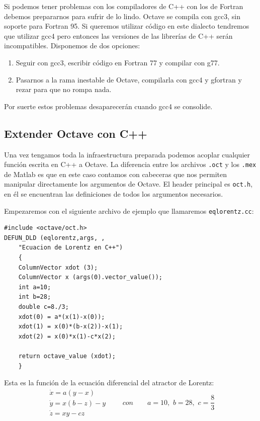 Si podemos tener problemas con los compiladores de C++ con los de
Fortran debemos prepararnos para sufrir de lo lindo. Octave se compila
con gcc3, sin soporte para Fortran 95. Si queremos utilizar código en
este dialecto tendremos que utilizar gcc4 pero entonces las versiones
de las librerías de C++ serán incompatibles. Disponemos de dos
opciones:

\begin{enumerate}
\item Seguir con gcc3, escribir código en Fortran 77 y compilar con
  g77.
\item Pasarnos a la rama inestable de Octave, compilarla con gcc4 y
  gfortran y rezar para que no rompa nada.
\end{enumerate}
Por suerte estos problemas desaparecerán cuando gcc4 se consolide.


\subsection{Extender Octave con C++}

Una vez tengamos toda la infraestructura preparada podemos acoplar
cualquier función escrita en C++ a Octave. La diferencia entre los
archivos \texttt{.oct} y los \texttt{.mex} de Matlab es que en este
caso contamos con cabeceras que nos permiten manipular directamente
los argumentos de Octave. El header principal es \texttt{oct.h}, en él
se encuentran las definiciones de todos los argumentos necesarios.

Empezaremos con el siguiente archivo de ejemplo que llamaremos
\texttt{eqlorentz.cc}:

\begin{verbatim}
#include <octave/oct.h>
DEFUN_DLD (eqlorentz,args, ,
    "Ecuacion de Lorentz en C++")
    {
    ColumnVector xdot (3);
    ColumnVector x (args(0).vector_value());
    int a=10;
    int b=28;
    double c=8./3;
    xdot(0) = a*(x(1)-x(0));
    xdot(1) = x(0)*(b-x(2))-x(1);
    xdot(2) = x(0)*x(1)-c*x(2);
    
    return octave_value (xdot);
    }
\end{verbatim}
Esta es la función de la ecuación diferencial del atractor de Lorentz:
$$
\begin{array}{l}
  \dot{x}=a(y-x)\\
  \dot{y}=x(b-z)-y\\
  \dot{z}=xy-cz\end{array}\qquad con\qquad 
a=10,\,\, b=28,\,\, c=\frac{8}{3}$$

